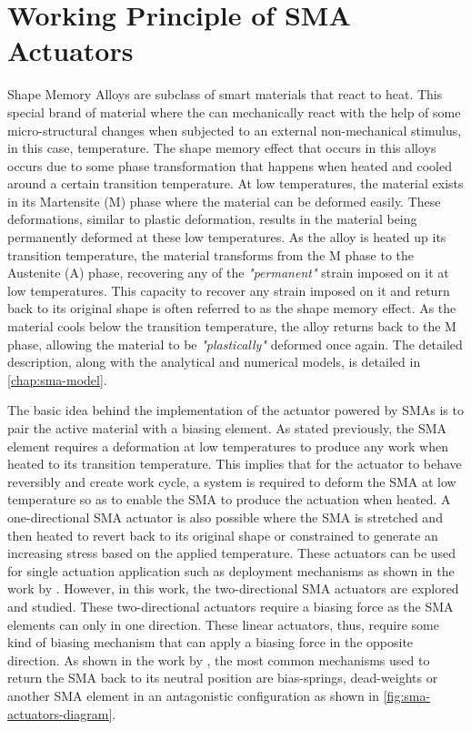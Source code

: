 \section{Working Principle of SMA Actuators}
Shape Memory Alloys are subclass of smart materials that react to heat. This special brand of material where the can mechanically react with the help of some micro-structural changes when subjected to an external non-mechanical stimulus, in this case, temperature. The shape memory effect that occurs in this alloys occurs due to some phase transformation that happens when heated and cooled around a certain transition temperature. At low temperatures, the material exists in its Martensite (M) phase where the material can be deformed easily. These deformations, similar to plastic deformation, results in the material being permanently deformed at these low temperatures. As the alloy is heated up its transition temperature, the material transforms from the M phase to the Austenite (A) phase, recovering any of the \textit{"permanent"} strain imposed on it at low temperatures. This capacity to recover any strain imposed on it and return back to its original shape is often referred to as the shape memory effect. As the material cools below the transition temperature, the alloy returns back to the M phase, allowing the material to be \textit{"plastically"} deformed once again. The detailed description, along with the analytical and numerical models, is detailed in \cref{chap:sma-model}.

The basic idea behind the implementation of the actuator powered by SMAs is to pair the active material with a biasing element. As stated previously, the SMA element requires a deformation at low temperatures to produce any work when heated to its transition temperature. This implies that for the actuator to behave reversibly and create work cycle, a system is required to deform the SMA at low temperature so as to enable the SMA to produce the actuation when heated. A one-directional SMA actuator is also possible where the SMA is stretched and then heated to revert back to its original shape or constrained to generate an increasing stress based on the applied temperature. These actuators can be used for single actuation application such as deployment mechanisms as shown in the work by \cite{mohdjaniDesigningShapeMemory2017}. However, in this work, the two-directional SMA actuators are explored and studied. These two-directional actuators require a biasing force as the SMA elements can only in one direction. These linear actuators, thus, require some kind of biasing mechanism that can apply a biasing force in the opposite direction. As shown in the work by \cite{bellouardShapeMemoryAlloys2008}, the most common mechanisms used to return the SMA back to its neutral position are bias-springs, dead-weights or another SMA element in an antagonistic configuration as shown in \cref{fig:sma-actuators-diagram}.

